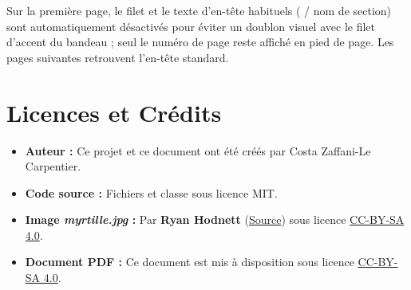 \documentclass[theme=myrtille]{myrtille}
\begin{document}
Sur la première page, le filet et le texte d'en-tête habituels ( / nom de section) sont automatiquement désactivés pour éviter un doublon visuel avec le filet d'accent du bandeau ; seul le numéro de page reste affiché en pied de page. Les pages suivantes retrouvent l'en-tête standard.

\section{Licences et Crédits}
\begin{itemize}
    \item \textbf{Auteur :} Ce projet et ce document ont été créés par Costa Zaffani-Le Carpentier.
    \item \textbf{Code source :} Fichiers  et classe  sous licence MIT.
    \item \textbf{Image \textit{myrtille.jpg} :} Par \textbf{Ryan Hodnett} (\href{https://commons.wikimedia.org/wiki/File:Common_Bilberry_(Vaccinium_myrtillus)_-_Bergen,_Norway_2021-07-31_(03).jpg}{Source}) sous licence \href{https://creativecommons.org/licenses/by-sa/4.0/deed.fr}{CC-BY-SA 4.0}.
    \item \textbf{Document PDF :} Ce document est mis à disposition sous licence \href{https://creativecommons.org/licenses/by-sa/4.0/deed.fr}{CC-BY-SA 4.0}.
\end{itemize}
\end{document}
